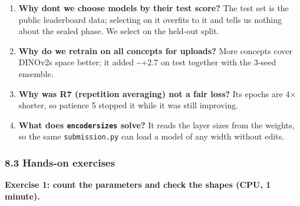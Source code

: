 \documentclass[
  11pt,
]{article}
\renewcommand{\_}{\oldunderscore\allowbreak}
\begin{document}
\begin{enumerate}
  test images \textasciitilde80, so
  subject aggregation removes less noise
  on held-out.
\item
  \textbf{Why don\textquotesingle t we
  choose models by their test score?}
  The test set is the public leaderboard
  data; selecting on it overfits to it
  and tells us nothing about the sealed
  phase. We select on the held-out
  split.
\item
  \textbf{Why do we retrain on all
  concepts for uploads?} More concepts
  cover DINOv2\textquotesingle s space
  better; it added \textasciitilde+2.7
  on test together with the 3-seed
  ensemble.
\item
  \textbf{Why was R7 (repetition
  averaging) not a fair loss?} Its
  epochs are 4× shorter, so patience 5
  stopped it while it was still
  improving.
\item
  \textbf{What does
  \texttt{encoder\_sizes} solve?} It
  reads the layer sizes from the
  weights, so the same
  \texttt{submission.py} can load a
  model of any width without edits.
\end{enumerate}

\subsubsection{8.3 Hands-on
exercises}\label{hands-on-exercises}

\textbf{Exercise 1: count the parameters
and check the shapes (CPU, 1 minute).}
\end{document}
